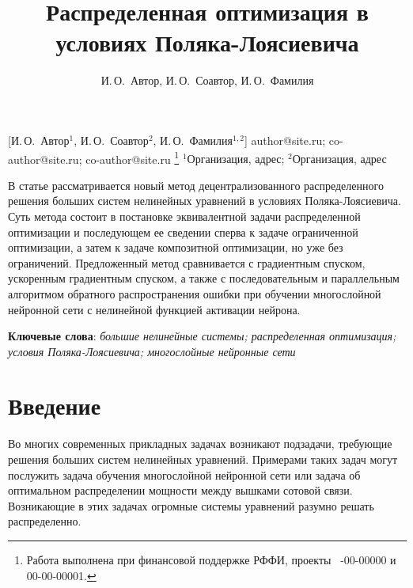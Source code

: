 \documentclass[12pt, twoside]{article}
\begin{document}
\title
    [Распределенная оптимизация в условиях Поляка-Лоясиевича] %
    {Распределенная оптимизация в условиях Поляка-Лоясиевича}
\author
    [И.\,О.~Автор] %
    {И.\,О.~Автор, И.\,О.~Соавтор, И.\,О.~Фамилия} %
    [И.\,О.~Автор$^1$, И.\,О.~Соавтор$^2$, И.\,О.~Фамилия$^{1,2}$] %
\email
    {author@site.ru; co-author@site.ru;  co-author@site.ru}
\thanks
    {Работа выполнена при
     финансовой поддержке РФФИ, проекты \No\ -00-00000 и 00-00-00001.}
\organization
    {$^1$Организация, адрес; $^2$Организация, адрес}
\abstract
    {В статье рассматривается новый метод децентрализованного распределенного решения больших систем нелинейных уравнений в условиях Поляка-Лоясиевича. Суть метода состоит в постановке эквивалентной задачи распределенной оптимизации и последующем ее сведении сперва к задаче ограниченной оптимизации, а затем к задаче композитной оптимизации, но уже без ограничений. 
Предложенный метод сравнивается с градиентным спуском, ускоренным градиентным спуском, а также с последовательным и параллельным алгоритмом обратного распространения ошибки при обучении многослойной нейронной сети с нелинейной функцией активации нейрона. 
	
\bigskip
\noindent
\textbf{Ключевые слова}: \emph {большие нелинейные системы; распределенная оптимизация; условия Поляка-Лоясиевича; многослойные нейронные сети}
}




\maketitle
\linenumbers

\section{Введение}
Во многих современных прикладных задачах возникают подзадачи, требующие решения больших систем нелинейных уравнений. Примерами таких задач могут послужить задача обучения многослойной нейронной сети или задача об оптимальном распределении мощности между вышками сотовой связи. Возникающие в этих задачах огромные системы уравнений разумно решать распределенно.
\end{document}
